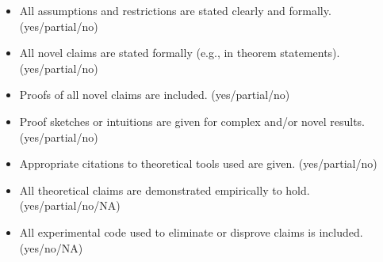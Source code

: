 \begin{itemize}
\item All assumptions and restrictions are stated clearly and formally. (yes/partial/no)
\item All novel claims are stated formally (e.g., in theorem statements). (yes/partial/no)
\item Proofs of all novel claims are included. (yes/partial/no)
\item Proof sketches or intuitions are given for complex and/or novel results. (yes/partial/no)
\item Appropriate citations to theoretical tools used are given. (yes/partial/no)
\item All theoretical claims are demonstrated empirically to hold. (yes/partial/no/NA)
\item All experimental code used to eliminate or disprove claims is included. (yes/no/NA)
\end{itemize}


